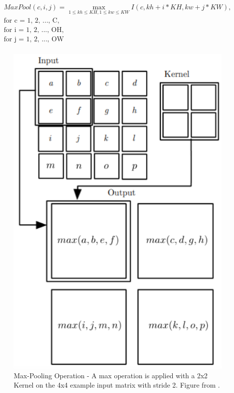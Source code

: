 \begin{equation}
	\label{eqn:max-pooling}
	\begin{split}
		MaxPool(c, i, j) = \max_{1 \leq kh \leq KH, 1 \leq kw \leq KW}
		I(c, kh + i * KH, kw + j * KW),\\
		\mbox{for c = 1, 2, ..., C},\\
		\mbox{for i = 1, 2, ..., OH},\\
		\mbox{for j = 1, 2, ..., OW}\\
	\end{split}
\end{equation}

\begin{figure} [H]
	\centering
	\includegraphics[scale=0.6]{../Images/CNNArchitectures/maxpooling-operation.png}
	\decoRule
	\caption[Max-Pooling Operation]{Max-Pooling Operation - A max operation is applied with a 2x2 Kernel on the 4x4 example input matrix with stride 2. Figure from \cite{Goodfellow-et-al-2016}.}
	\label{fig:max-pooling-operation}
\end{figure}


